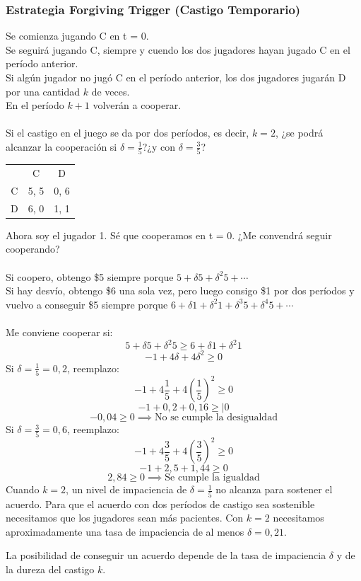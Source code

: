 \documentclass{article}
\begin{document}
        \subsubsection*{Estrategia Forgiving Trigger (Castigo Temporario)}
            Se comienza jugando C en t = 0. \\
            Se seguirá jugando C, siempre y cuendo los dos jugadores hayan jugado C en el período anterior. \\
            Si algún jugador no jugó C en el período anterior, los dos jugadores jugarán D por una cantidad $k$ de veces. \\
            En el período $k+1$ volverán a cooperar. \\
            \\
            Si el castigo en el juego se da por dos períodos, es decir, $k = 2$, ¿se podrá alcanzar la cooperación si $\delta = \frac{1}{5}$?¿y con $\delta = \frac{3}{5}$?
            \begin{table}[H]
                \centering
                    \begin{tabular}{|c|c|c|}
                          & C    & D    \\
                        C & 5, 5 & 0, 6 \\
                        D & 6, 0 & 1, 1 \\
                    \end{tabular}            
            \end{table}
            Ahora soy el jugador 1. Sé que cooperamos en t = 0. ¿Me convendrá seguir cooperando? \\
            \\
            Si coopero, obtengo \$5 siempre porque \(5 + \delta 5 + \delta^{2}5 + \cdots\) \\
            Si hay desvío, obtengo \$6 una sola vez, pero luego consigo \$1 por dos períodos y vuelvo a conseguir \$5 siempre porque \(6 + \delta 1 + \delta^{2}1 + \delta^{3}5 + \delta^{4}5 + \cdots\) \\
            \\
            Me conviene cooperar si:
            \[5+ \delta 5 + \delta^{2}5 \geq 6 + \delta 1 + \delta^{2}1\]
            \[-1 + 4 \delta + 4 \delta^{2} \geq 0\]
            Si \(\delta = \frac{1}{5} = 0,2\), reemplazo:
            \[-1+4\frac{1}{5}+4(\frac{1}{5})^{2} \geq 0\]
            \[-1+0,2+0,16 \geq| 0\]
            \[-0,04 \geq 0 \implies \text{No se cumple la desigualdad}\]
            Si \(\delta = \frac{3}{5} = 0,6\), reemplazo:
            \[-1+4\frac{3}{5}+4(\frac{3}{5})^{2} \geq 0\]
            \[-1+2,5+1,44 \geq 0\]
            \[2,84 \geq 0 \implies \text{Se cumple la igualdad}\]
            Cuando $k = 2$, un nivel de impaciencia de $\delta = \frac{1}{5}$ no alcanza para sostener el acuerdo. Para que el acuerdo con dos períodos de castigo sea sostenible necesitamos que los jugadores sean más pacientes. Con $k = 2$ necesitamos aproximadamente una tasa de impaciencia de al menos $\delta = 0,21$.

            La posibilidad de conseguir un acuerdo depende de la tasa de impaciencia $\delta$ y de la dureza del castigo $k$.
\end{document}
